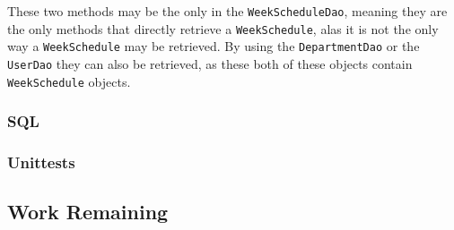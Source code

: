 These two methods may be the only in the \texttt{WeekScheduleDao}, meaning they are the only methods that directly retrieve a \texttt{WeekSchedule}, alas it is not the only way a \texttt{WeekSchedule} may be retrieved.
By using the \texttt{DepartmentDao} or the \texttt{UserDao} they can also be retrieved, as these both of these objects contain \texttt{WeekSchedule} objects.

\subsubsection{SQL}

\subsubsection{Unittests}

\subsection{Work Remaining} %

